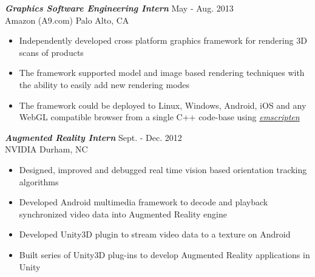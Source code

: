 \documentclass[line,10pt]{res}
\newcommand{\resumetitlemar}{0.5em}
\begin{document}
\begin{resume}
{\sl \textbf{Graphics Software Engineering Intern}} \hfill May - Aug. 2013 \\
Amazon (A9.com) \hfill Palo Alto, CA\null
\vspace{\resumetitlemar}
\begin{itemize}  \itemsep -2pt
\item Independently developed cross platform graphics framework for rendering 3D scans of products
\item The framework supported model and image based rendering techniques with the ability to easily add new rendering modes
\item The framework could be deployed to Linux, Windows, Android, iOS and any WebGL compatible browser from a single C++ code-base using \href{https://github.com/kripken/emscripten}{\textit{emscripten}}
\end{itemize}

{\sl \textbf{Augmented Reality Intern}} \hfill Sept. - Dec. 2012 \\
NVIDIA \hfill Durham, NC\null
\vspace{\resumetitlemar}
\begin{itemize} \itemsep -2pt
\item Designed, improved and debugged real time vision based orientation tracking algorithms
\item Developed Android multimedia framework to decode and playback synchronized video data into Augmented Reality engine
\item Developed Unity3D plugin to stream video data to a texture on Android
\item Built series of Unity3D plug-ins to develop Augmented Reality applications in Unity
\end{itemize}




\end{resume}
\end{document}
